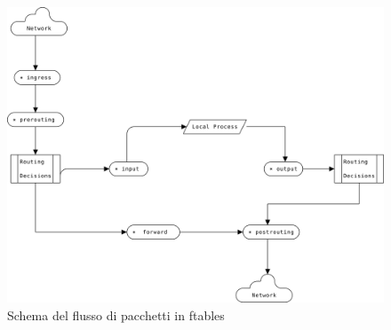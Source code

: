 \begin{figure}[H]
    \centering
    \includegraphics[width=\linewidth]{flow.svg.png}
    \caption{Schema del flusso di pacchetti in ftables}
    \label{fig:flow}
\end{figure}


